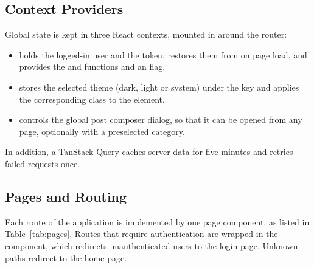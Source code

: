 \subsection{Context Providers}

Global state is kept in three React contexts, mounted in  around the
router:

\begin{itemize}
  \item {} holds the logged-in user and the token, restores them from
     on page load, and provides the  and 
    functions and an  flag.
  \item {} stores the selected theme (dark, light or system) under the
    key  and applies the corresponding class to the
     element.
  \item {} controls the global post composer dialog, so that it can be
    opened from any page, optionally with a preselected category.
\end{itemize}

In addition, a TanStack Query  caches server data for five minutes
and retries failed requests once.

\subsection{Pages and Routing}

Each route of the application is implemented by one page component, as listed in
Table~\ref{tab:pages}. Routes that require authentication are wrapped in the
 component, which redirects unauthenticated users to the login
page. Unknown paths redirect to the home page.


